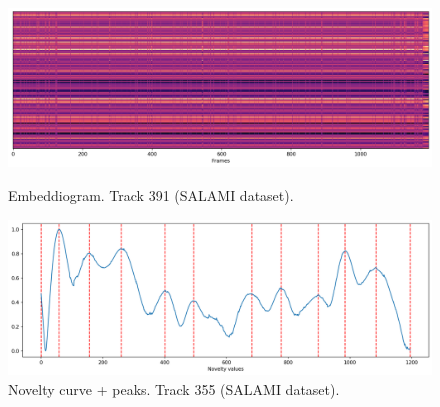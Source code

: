 \begin{figure}[ht]
  \centering
  \begin{minipage}[b]{1.0\linewidth}
    \centering
    \includegraphics[width=\linewidth]{figures/images/355embeddiogramnormalized.png}
    \caption[Embeddiogram. Track 355 (SALAMI dataset).]{Embeddiogram. Track 391 (SALAMI dataset).}
    \label{fig:image1}
  \end{minipage}

  \begin{minipage}[b]{1.0\linewidth}
    \centering
    \includegraphics[width=\linewidth]{figures/images/355novelty.png}
    \caption[Novelty curve + peaks. Track 391 (SALAMI dataset).]{Novelty curve + peaks. Track 355 (SALAMI dataset).}
    \label{fig:image2}
  \end{minipage}
\end{figure}


